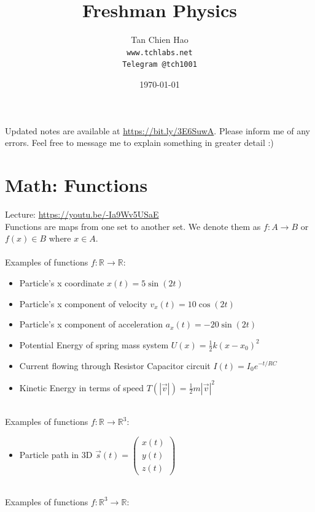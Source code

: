 \documentclass{article}
\title{Freshman Physics}
\author{
    Tan Chien Hao\\
    \texttt{www.tchlabs.net}\\
    \texttt{Telegram @tch1001}
}
\date{\today}
\begin{document}
\newif\ifpaper

\paperfalse 

\maketitle

Updated notes are available at \url{https://bit.ly/3E6SuwA}. Please inform me of any errors. Feel free to message me to explain something in greater detail :)
\tableofcontents

\section{Math: Functions}
Lecture: \url{https://youtu.be/-Ia9Wv5USaE}\\[10pt]
Functions are maps from one set to another set. We denote them as $f: A \rightarrow B$ or $f(x) \in B$ where $x\in A$. \\
\\
Examples of functions $f: \mathbb R \to \mathbb R$:
\begin{itemize}
    \item Particle's x coordinate $x(t) = 5 \sin (2t)$
    \item Particle's x component of velocity $v_x(t) = 10 \cos (2t)$
    \item Particle's x component of acceleration $a_x(t) = - 20 \sin (2t)$
    \item Potential Energy of spring mass system $U(x) = \frac{1}{2} k(x-x_0)^2$
    \item Current flowing through Resistor Capacitor circuit $I(t) = I_0 e^{-{t}/{RC}}$
    \item Kinetic Energy in terms of speed $T(|\vec{v}|) = \frac{1}{2} m |\vec{v}|^2$
\end{itemize}
\leavevmode \\
Examples of functions $f: \mathbb R \to \mathbb R^3$:
\begin{itemize}
    \item Particle path in 3D $\vec{s}(t) = \left(\begin{array}{l}
         x(t) \\
         y(t) \\
         z(t) 
    \end{array}\right) $
\end{itemize}
\leavevmode \\
Examples of functions $f: \mathbb R^3 \to \mathbb R$:
\end{document}
